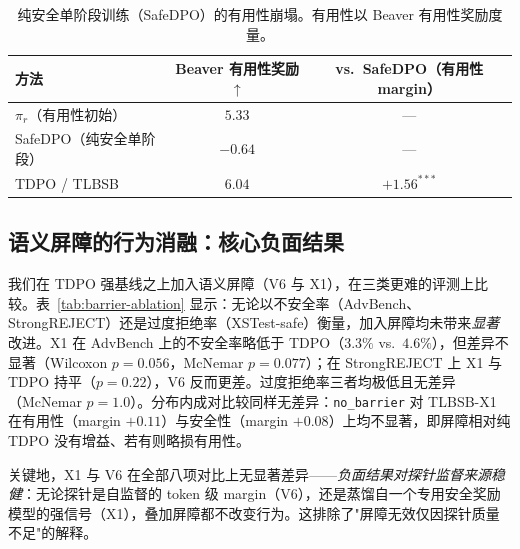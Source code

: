 \documentclass[lettersize,journal]{IEEEtran}
\begin{document}
\begin{table}[t]
\centering
\caption{纯安全单阶段训练（SafeDPO）的有用性崩塌。有用性以 Beaver 有用性奖励度量。}
\label{tab:safedpo}
\begin{tabular}{lcc}
\toprule
方法 & Beaver 有用性奖励 $\uparrow$ & vs.\ SafeDPO（有用性 margin） \\
\midrule
$\pi_r$（有用性初始） & $5.33$ & — \\
SafeDPO（纯安全单阶段） & $-0.64$ & — \\
TDPO / TLBSB & $6.04$ & $+1.56^{***}$ \\
\bottomrule
\end{tabular}
\end{table}

\subsection{语义屏障的行为消融：核心负面结果}\label{exp:barrier}
我们在 TDPO 强基线之上加入语义屏障（V6 与 X1），在三类更难的评测上比较。表~\ref{tab:barrier-ablation} 显示：无论以不安全率（AdvBench、StrongREJECT）还是过度拒绝率（XSTest-safe）衡量，加入屏障均未带来\emph{显著}改进。X1 在 AdvBench 上的不安全率略低于 TDPO（$3.3\%$ vs.\ $4.6\%$），但差异不显著（Wilcoxon $p{=}0.056$，McNemar $p{=}0.077$）；在 StrongREJECT 上 X1 与 TDPO 持平（$p{=}0.22$），V6 反而更差。过度拒绝率三者均极低且无差异（McNemar $p{=}1.0$）。分布内成对比较同样无差异：\texttt{no\_barrier} 对 TLBSB-X1 在有用性（margin $+0.11$）与安全性（margin $+0.08$）上均不显著，即屏障相对纯 TDPO 没有增益、若有则略损有用性。

关键地，X1 与 V6 在全部八项对比上无显著差异——\emph{负面结果对探针监督来源稳健}：无论探针是自监督的 token 级 margin（V6），还是蒸馏自一个专用安全奖励模型的强信号（X1），叠加屏障都不改变行为。这排除了"屏障无效仅因探针质量不足"的解释。

\begin{table}[t]
\centering
\caption{语义屏障的行为消融（H$\to$S）。AdvBench/StrongREJECT 报告不安全率（越低越好），XSTest-safe 报告对安全 prompt 的拒答率（越低越好）。无害性均值（$/10$）附于括号。所有方法间差异均不显著（见正文统计检验）。}
\label{tab:barrier-ablation}
\end{table}
\end{document}
